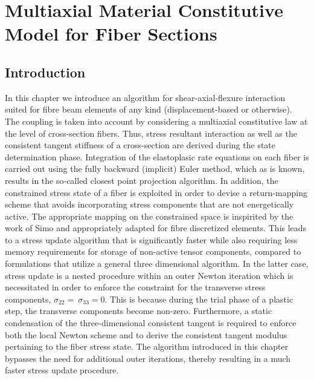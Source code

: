 \chapter{Multiaxial Material Constitutive Model for Fiber Sections}

\section{Introduction}\label{section:CH3-S1}

In this chapter we introduce an algorithm for shear-axial-flexure interaction 
suited for fibre beam elements of any kind (displacement-based or otherwise). 
The coupling is taken into account by considering a multiaxial constitutive law 
at the level of cross-section fibers. Thus, stress resultant interaction as 
well as the consistent tangent stiffness of a cross-section are derived during 
the state determination phase. Integration of the elastoplasic rate equations 
on each fiber is carried out using the fully backward (implicit) Euler method, 
which as is known, results in the so-called closest point projection algorithm. 
In addition, the constrained stress state of a fiber is exploited in order to 
devise a return-mapping scheme that avoids incorporating stress components that 
are not energetically active. The appropriate mapping on the constrained space 
is inspirited by the work of Simo\cite{Simo1986} and appropriately adapted for 
fibre 
discretized elements. This leads to a stress update algorithm that is 
significantly faster while also requiring less memory requirements for storage 
of non-active tensor components, compared to formulations that utilize a 
general three 
dimensional 
algorithm\cite{Papachristidis2010,Saritas2009,Ceresa2009,Gregori2007,Kagermanov2017}.
 In the latter case, stress update is a nested 
procedure within an outer Newton iteration which is necessitated in order to 
enforce the constraint for the transverse stress components, $\sigma_{22}=\ 
\sigma_{33}=0$. This is because during the trial phase of a plastic step, the 
transverse components become non-zero. Furthermore, a static condensation of 
the three-dimensional consistent tangent is required to enforce both the local 
Newton scheme and to derive the consistent tangent modulus pertaining to the 
fiber stress state. The algorithm introduced in this chapter bypasses the need 
for additional outer iterations, thereby resulting in a much faster stress 
update procedure.

